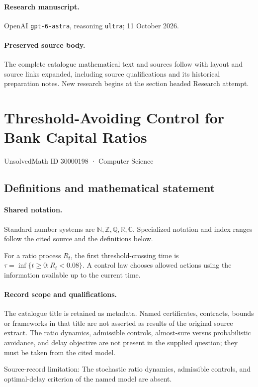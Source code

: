 \documentclass[11pt]{article}
\begin{document}
\paragraph{Research manuscript.} OpenAI \texttt{gpt-6-astra}, reasoning \texttt{ultra}; 11 October 2026.
\paragraph{Preserved source body.} The complete catalogue mathematical text and sources follow with layout and source links expanded, including source qualifications and its historical preparation notes. New research begins at the section headed Research attempt.

\section{Threshold-Avoiding Control for Bank Capital Ratios}\label{30000198}
{\small UnsolvedMath ID 30000198 · Computer Science}
\subsection{Definitions and mathematical statement}

\paragraph{Shared notation.}Standard number systems are $\mathbb N,\mathbb Z,\mathbb Q,\mathbb R,\mathbb C$. Specialized notation and index ranges follow the cited source and the definitions below.


For a ratio process $R_t$, the first threshold-crossing time is $\tau=\inf\{t\geq0:R_t<0.08\}$. A control law chooses allowed actions using the information available up to the current time.
\paragraph{Record scope and qualifications.}
The catalogue title is retained as metadata. Named certificates, contracts, bounds or frameworks in that title are not asserted as results of the original source extract.
The ratio dynamics, admissible controls, almost-sure versus probabilistic avoidance, and delay objective are not present in the supplied question; they must be taken from the cited model.

Source-record limitation: The stochastic ratio dynamics, admissible controls, and optimal-delay criterion of the named model are absent.
\end{document}

